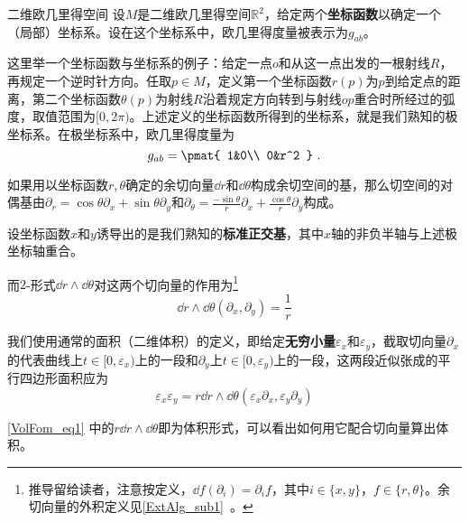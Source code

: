 \begin{example}{二维欧几里得空间}\label{VolFom_ex1}
设$M$是二维欧几里得空间$\mathbb{R}^2$，给定两个\textbf{坐标函数}以确定一个（局部）坐标系。设在这个坐标系中，欧几里得度量被表示为$g_{ab}$。

这里举一个坐标函数与坐标系的例子：给定一点$o$和从这一点出发的一根射线$R$，再规定一个逆时针方向。任取$p\in M$，定义第一个坐标函数$r(p)$为$p$到给定点的距离，第二个坐标函数$\theta(p)$为射线$R$沿着规定方向转到与射线$op$重合时所经过的弧度，取值范围为$[0, 2\pi)$。上述定义的坐标函数所得到的坐标系，就是我们熟知的极坐标系。在极坐标系中，欧几里得度量为
\begin{equation}
g_{ab}=\pmat{
    1&0\\
    0&r^2
}~.
\end{equation}


如果用以坐标函数$r, \theta$确定的余切向量$\dd r$和$\dd \theta$构成余切空间的基，那么切空间的对偶基由$\partial_r=\cos\theta\partial_x+\sin\theta\partial_y$和$\partial_\theta=\frac{-\sin\theta}{r}\partial_x+\frac{\cos\theta}{r}\partial_y$构成。



设坐标函数$x$和$y$诱导出的是我们熟知的\textbf{标准正交基}，其中$x$轴的非负半轴与上述极坐标轴重合。





而$2$-形式$\dd r\wedge\dd \theta$对这两个切向量的作用为\footnote{推导留给读者，注意按定义，$\dd f(\partial_i)=\partial_i f$，其中$i\in\{x, y\}$，$f\in\{r, \theta\}$。余切向量的外积定义见\autoref{ExtAlg_sub1}~。}
\begin{equation}
\dd r\wedge\dd \theta(\partial_x, \partial_y) = \frac{1}{r}
\end{equation}

我们使用通常的面积（二维体积）的定义，即给定\textbf{无穷小量}$\varepsilon_x$和$\varepsilon_y$，截取切向量$\partial_x$的代表曲线上$t\in[0, \varepsilon_x)$上的一段和$\partial_y$上$t\in[0, \varepsilon_y)$上的一段，这两段近似张成的平行四边形面积应为
\begin{equation}\label{VolFom_eq1}
\varepsilon_x\varepsilon_y = r\dd r\wedge\dd \theta(\varepsilon_x\partial_x, \varepsilon_y\partial_y)
\end{equation}


\autoref{VolFom_eq1} 中的$r\dd r\wedge\dd \theta$即为体积形式，可以看出如何用它配合切向量算出体积。


\end{example}



